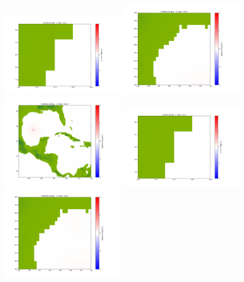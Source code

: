 \documentclass[11pt]{article}
\begin{document}
\vskip 10pt 
\includegraphics[width=0.475\textwidth]{frame0005fig1001.png}
\includegraphics[width=0.475\textwidth]{frame0005fig1002.png}
\vskip 10pt 
\includegraphics[width=0.475\textwidth]{frame0005fig1003.png}
\vskip 10pt 
\includegraphics[width=0.475\textwidth]{frame0006fig1001.png}
\includegraphics[width=0.475\textwidth]{frame0006fig1002.png}
\end{document}
